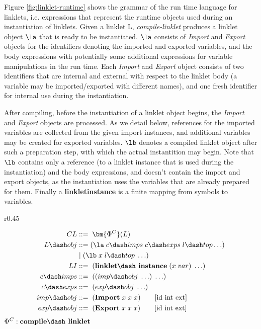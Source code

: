 Figure \ref{fig:linklet-runtime} shows the grammar of the run\dash
time language for linklets, i.e. expressions that represent the
run\dash time objects used during an instantiation of linklets. Given a
linklet L, \emph{compile-linklet} produces a linklet object $\la$ that
is ready to be instantiated. $\la$ consists of \textit{Import} and
\textit{Export} objects for the identifiers denoting the imported and
exported variables, and the body expressions with potentially some
additional expressions for variable manipulations in the run\dash
time. Each \textit{Import} and \textit{Export} object consists of two
identifiers that are internal and external with respect to the linklet
body (a variable may be imported/exported with different names), and
one fresh identifier for internal use during the instantiation.

After compiling, before the instantiation of a linklet object begins,
the \textit{Import} and \textit{Export} objects are processed. As we
detail below, references for the imported variables are collected from
the given import instances, and additional variables may be created
for exported variables. $\lb$ denotes a compiled linklet object after
such a preparation step, with which the actual instantition may
begin. Note that $\lb$ contains only a reference (to a linklet
instance that is used during the instantiation) and the body
expressions, and doesn't contain the import and export objects, as the
instantiation uses the variables that are already prepared for
them. Finally a \textbf{linklet\dash instance} is a finite mapping
from symbols to variables.

\begin{wrapfigure}[15]{r}{0.45\textwidth}
  \vspace{-1cm}
  \footnotesize
  \begin{mdframed}
    \begin{align*}
      CL             &::=\; \bm{\Phi^C}(L)\\
      L\dash obj     &::= (\la\; c\dash imps \; c\dash exps \; l\dash top \ldots)\\
      \;           &\;|\; (\lb\; x\; l\dash top\; \ldots) \\
      LI             &::=\; (\textbf{linklet\dash instance}\; (x\; var)\; \ldots) \\
      c\dash imps    &::=\; ((imp\dash obj\; \ldots)\; \ldots)\\
      c\dash exps    &::=\; (exp\dash obj\; \ldots)\\
      imp\dash obj   &::=\; (\textbf{Import}\; x\; x\; x) \tag*{[id int ext]} \\
      exp\dash obj   &::=\; (\textbf{Export}\; x\; x\; x) \tag*{[id int ext]} \\
    \end{align*}
    \hfill \footnotesize $\Phi^C : \textbf{compile\dash linklet}$
    \caption{Linklet Runtime Language}
    \label{fig:linklet-runtime}
  \end{mdframed}
\end{wrapfigure}

